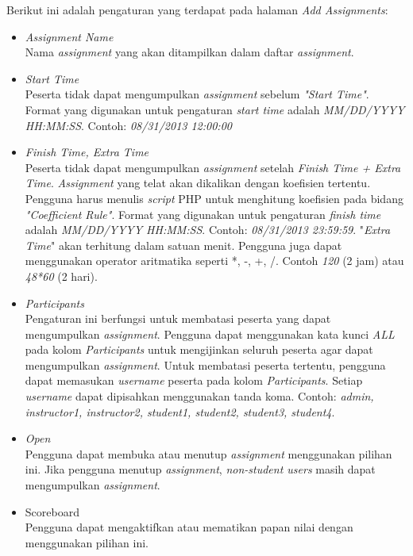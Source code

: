 Berikut ini adalah pengaturan yang terdapat pada halaman \textit{Add Assignments}:
\begin{itemize}
	\item \textit{Assignment Name} \\
	Nama \textit{assignment} yang akan ditampilkan dalam daftar \textit{assignment}.
	
	\item \textit{Start Time} \\
	Peserta tidak dapat mengumpulkan \textit{assignment} sebelum \textit{"Start Time"}. Format yang digunakan untuk pengaturan \textit{start time} adalah \textit{MM/DD/YYYY HH:MM:SS}. Contoh: \textit{08/31/2013 12:00:00}
	
	\item \textit{Finish Time, Extra Time}\\
	Peserta tidak dapat mengumpulkan \textit{assignment} setelah \textit{Finish Time + Extra Time}. \textit{Assignment} yang telat akan dikalikan dengan koefisien tertentu. Pengguna harus menulis \textit{script} PHP untuk menghitung koefisien pada bidang \textit{"Coefficient Rule"}. Format yang digunakan untuk pengaturan \textit{finish time} adalah \textit{MM/DD/YYYY HH:MM:SS}. Contoh: \textit{08/31/2013 23:59:59}. "\textit{Extra Time}" akan terhitung dalam satuan menit. Pengguna juga dapat menggunakan operator aritmatika seperti *, -, +, /. Contoh \textit{120} (2 jam) atau \textit{48*60} (2 hari).
	
	\item \textit{Participants} \\
	Pengaturan ini berfungsi untuk membatasi peserta yang dapat mengumpulkan \textit{assignment}. Pengguna dapat menggunakan kata kunci \textit{ALL} pada kolom \textit{Participants} untuk mengijinkan seluruh peserta agar dapat mengumpulkan \textit{assignment}. Untuk membatasi peserta tertentu, pengguna dapat memasukan \textit{username} peserta pada kolom \textit{Participants}. Setiap \textit{username} dapat dipisahkan menggunakan tanda koma. Contoh: \textit{admin, instructor1, instructor2, student1, student2, student3, student4}.
	
	\item \textit{Open} \\
	Pengguna dapat membuka atau menutup \textit{assignment} menggunakan pilihan ini. Jika pengguna menutup \textit{assignment}, \textit{non-student users} masih dapat mengumpulkan \textit{assignment}.
	
	\item Scoreboard \\
	Pengguna dapat mengaktifkan atau mematikan papan nilai dengan menggunakan pilihan ini.
	

\end{itemize}
